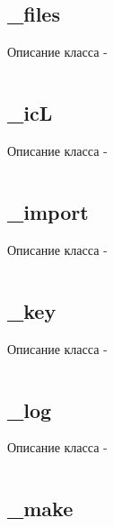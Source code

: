 \documentclass[a4paper, 14pt]{extarticle}
\begin{document}
\subsection{{\color{orange} \_files}}

Описание класса  -
\begin{lstlisting}[numbers=none]

\end{lstlisting}

\subsection{{\color{orange} \_icL}}

Описание класса  -
\begin{lstlisting}[numbers=none]

\end{lstlisting}

\subsection{{\color{orange} \_import}}

Описание класса  -
\begin{lstlisting}[numbers=none]

\end{lstlisting}

\subsection{{\color{orange} \_key}}

Описание класса  -
\begin{lstlisting}[numbers=none]

\end{lstlisting}

\subsection{{\color{orange} \_log}}

Описание класса  -
\begin{lstlisting}[numbers=none]

\end{lstlisting}

\subsection{{\color{orange} \_make}}
\end{document}
